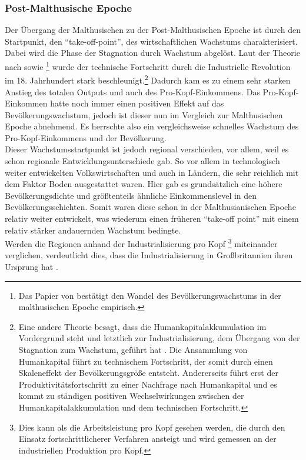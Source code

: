 \subsubsection*{Post-Malthusische Epoche}
%
Der Übergang der Malthusischen zu der Post-Malthusischen Epoche ist durch den Startpunkt, den "`take-off-point"', des wirtschaftlichen Wachstums charakterisiert. Dabei wird die Phase der Stagnation durch Wachstum abgelöst. 
Laut der Theorie nach \cite{Hansen.2002} sowie \cite{Ashraf.2008}\footnote{Das Papier von \cite{Ashraf.2008} bestätigt den Wandel des Bevölkerungswachstums in der malthusischen Epoche empirisch.} wurde der technische Fortschritt  durch die Industrielle Revolution im 18. Jahrhundert stark beschleunigt.\footnote{Eine andere Theorie besagt, dass die Humankapitalakkumulation im Vordergrund steht und letztlich zur Industrialisierung, dem Übergang von der Stagnation zum Wachstum, geführt hat \cite{Galor.2000}. Die Ansammlung von Humankapital führt zu technischem Fortschritt, der somit durch einen Skaleneffekt der Bevölkerungsgröße entsteht. Andererseits führt erst der Produktivitätsfortschritt zu einer Nachfrage nach Humankapital und es kommt zu ständigen positiven Wechselwirkungen zwischen der Humankapitalakkumulation und dem technischen Fortschritt.} Dadurch kam es zu einem sehr starken Anstieg des totalen Outputs und auch des Pro-Kopf-Einkommens. Das Pro-Kopf-Einkommen hatte noch immer einen positiven Effekt auf das Bevölkerungswachstum, jedoch ist dieser nun im Vergleich zur Malthusischen Epoche  abnehmend. Es herrschte also ein vergleichsweise schnelles Wachstum des Pro-Kopf-Einkommens und der Bevölkerung. \\ Dieser Wachstumsstartpunkt ist jedoch regional verschieden, vor allem, weil es schon regionale Entwicklungsunterschiede gab. So vor allem in technologisch weiter entwickelten Volkswirtschaften und auch in Ländern, die sehr reichlich mit dem Faktor Boden ausgestattet waren. Hier gab es grundsätzlich eine höhere Bevölkerungsdichte und größtenteils ähnliche Einkommenslevel in den Bevölkerungsschichten. Somit waren diese schon in der Malthusianischen Epoche relativ weiter entwickelt, was wiederum einen früheren "`take-off point"' mit einem relativ stärker andauernden Wachstum bedingte.\\ Werden die Regionen anhand der Industrialisierung pro Kopf \footnote{Dies kann als die Arbeitsleistung pro Kopf gesehen werden, die durch den Einsatz fortschrittlicherer Verfahren ansteigt und wird gemessen an der industriellen Produktion pro Kopf.} miteinander verglichen, verdeutlicht dies, dass die Industrialisierung in Großbritannien ihren Ursprung hat \cite{Galor.2014}.\\
